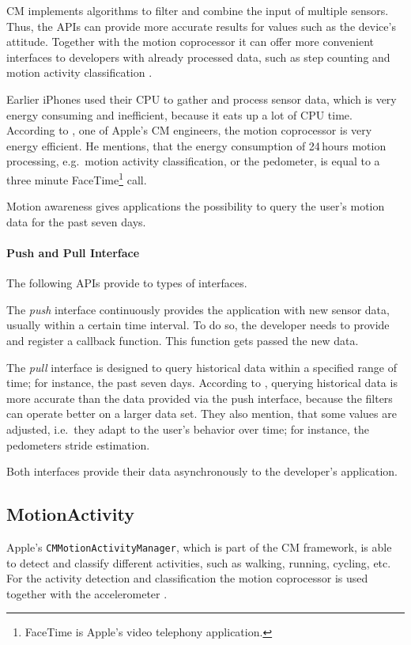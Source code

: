 \ac{CM} implements algorithms to filter and combine the input of multiple sensors. Thus, the \acsp{API} can provide more accurate results for values such as the device's attitude. Together with the motion coprocessor it can offer more convenient interfaces to developers with already processed data, such as step counting and motion activity classification \citep{apple:wwdc_2014_pham}.

Earlier iPhones used their \acs{CPU} to gather and process sensor data, which is very energy consuming and inefficient, because it eats up a lot of \acs{CPU} time. According to \citet{apple:wwdc_2012_pham}, one of Apple's \ac{CM} engineers, the motion coprocessor is very energy efficient. He mentions, that the energy consumption of 24\,hours motion processing, e.g.\ motion activity classification, or the pedometer, is equal to a three minute FaceTime\footnote{FaceTime is Apple's video telephony application.} call.

Motion awareness gives applications the possibility to query the user's motion data for the past seven days.

\paragraph{Push and Pull Interface}
The following \acsp{API} provide to types of interfaces.

The \emph{push} interface continuously provides the application with new sensor data, usually within a certain time interval. To do so, the developer needs to provide and register a callback function. This function gets passed the new data.

The \emph{pull} interface is designed to query historical data within a specified range of time; for instance, the past seven days. According to \citet{apple:wwdc_2014_pham}, querying historical data is more accurate than the data provided via the push interface, because the filters can operate better on a larger data set. They also mention, that some values are adjusted, i.e.\ they adapt to the user's behavior over time; for instance, the pedometers stride estimation.

Both interfaces provide their data asynchronously to the developer's application.

\subsection{MotionActivity}
Apple's \texttt{CMMotionActivityManager}, which is part of the \ac{CM} framework, is able to detect and classify different activities, such as walking, running, cycling, etc. For the activity detection and classification the motion coprocessor is used together with the accelerometer \citep{apple:wwdc_2014_pham}.

